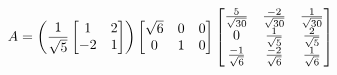 \documentclass[preview]{standalone}
\begin{document}
\begin{align*}
\special{dvisvgm:raw <g id='unique000'>}A =  \special{dvisvgm:raw </g>}\special{dvisvgm:raw <g id='unique001'>}\left( \frac{1}{\sqrt{5}} \begin{bmatrix} 1 & 2 \\ -2 & 1 \end{bmatrix} \right) \special{dvisvgm:raw </g>}\special{dvisvgm:raw <g id='unique002'>}\begin{bmatrix} \sqrt{6} & 0 & 0 \\ 0 & 1 & 0 \end{bmatrix} \special{dvisvgm:raw </g>}\special{dvisvgm:raw <g id='unique003'>}\begin{bmatrix} \frac{5}{\sqrt{30}} & \frac{-2}{\sqrt{30}} & \frac{1}{\sqrt{30}} \\ 0 & \frac{1}{\sqrt{5}} & \frac{2}{\sqrt{5}} \\ \frac{-1}{\sqrt{6}} & \frac{-2}{\sqrt{6}} & \frac{1}{\sqrt{6}} \end{bmatrix}\special{dvisvgm:raw </g>}
\end{align*}
\end{document}
